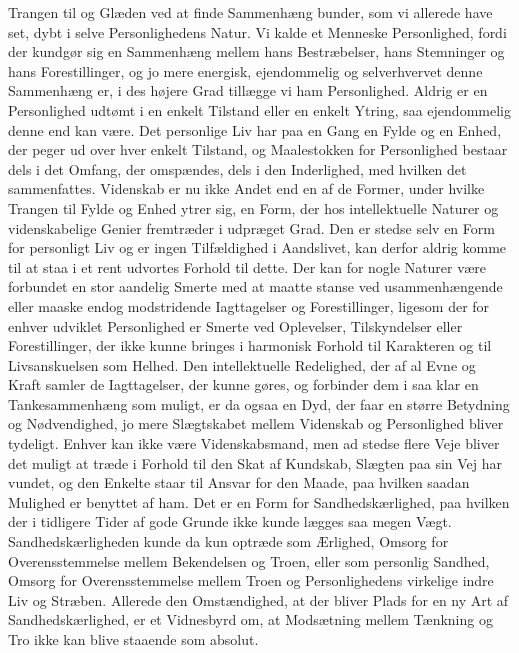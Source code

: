 \documentclass[12pt,a4paper]{article}
\newcommand{\opage}[1]{\marginnote{\footnotesize\textit{[#1]}}}
\begin{document}
Trangen til og Glæden ved at finde Sammenhæng bunder, som vi allerede have
set, dybt i selve Personlighedens Natur. Vi kalde et Menneske Personlighed,
fordi der kundgør sig en Sammenhæng mellem hans Bestræbelser, hans Stemninger
og hans Forestillinger, og jo mere energisk, ejendommelig og selverhvervet
denne Sammenhæng er, i des højere Grad tillægge vi ham Personlighed. Aldrig
er en Personlighed udtømt i en enkelt Tilstand eller en enkelt Ytring, saa
ejendommelig denne end kan være. Det personlige Liv har paa en Gang en Fylde
og en Enhed, der peger ud over hver enkelt Tilstand, og Maalestokken for
Personlighed bestaar dels i det Omfang, der omspændes, dels i den Inderlighed,
med hvilken det sammenfattes. Videnskab er nu ikke Andet end en af de Former,
under hvilke Trangen til Fylde og Enhed ytrer sig, en Form, der hos
intellektuelle Naturer og videnskabelige Genier fremtræder i udpræget Grad.
Den er stedse selv en Form for personligt Liv og er ingen Tilfældighed i
Aandslivet, kan derfor aldrig komme til at staa i et rent udvortes Forhold
til dette. Der kan for nogle Naturer være forbundet en stor aandelig Smerte
med at maatte stanse ved usammenhængende eller maaske endog modstridende
Iagttagelser og Forestillinger, ligesom der for enhver udviklet Personlighed
er Smerte ved Oplevelser, Tilskyndelser eller Forestillinger, der ikke kunne
bringes i harmonisk Forhold til Karakteren og til Livsanskuelsen som Helhed.
Den intellektuelle Redelighed, der af al Evne og Kraft samler de
Iagttagelser, der kunne gøres, og forbinder dem i saa klar en
Tankesammenhæng som muligt, er da ogsaa en Dyd, der faar en større Betydning
og Nødvendighed, jo mere Slægtskabet mellem Videnskab og Personlighed bliver
tydeligt. Enhver kan ikke være Videnskabsmand, men ad stedse flere Veje \opage{41}
bliver det muligt at træde i Forhold til den Skat af Kundskab, Slægten paa sin
Vej har vundet, og den Enkelte staar til Ansvar for den Maade, paa hvilken
saadan Mulighed er benyttet af ham. Det er en Form for Sandhedskærlighed, paa
hvilken der i tidligere Tider af gode Grunde ikke kunde lægges saa megen Vægt.
Sandhedskærligheden kunde da kun optræde som Ærlighed, Omsorg for
Overensstemmelse mellem Bekendelsen og Troen, eller som personlig Sandhed,
Omsorg for Overensstemmelse mellem Troen og Personlighedens virkelige indre Liv
og Stræben. Allerede den Omstændighed, at der bliver Plads for en ny Art af
Sandhedskærlighed, er et Vidnesbyrd om, at Modsætning mellem Tænkning og Tro
ikke kan blive staaende som absolut.

\medskip
\end{document}
